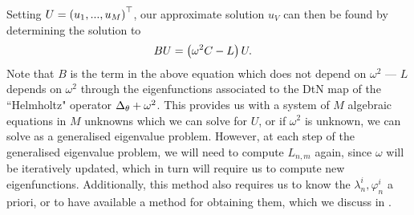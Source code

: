 Setting $U = \left( u_1, ..., u_M \right)^\top$, our approximate solution $u_V$ can then be found by determining the solution to
\begin{align*}
	B U &= \left( \omega^2 C - L \right) U.
\end{align*}
Note that $B$ is the term in the above equation which does not depend on $\omega^2$ --- $L$ depends on $\omega^2$ through the eigenfunctions associated to the DtN map of the ``Helmholtz" operator $\Delta_{\theta}+\omega^2$.
This provides us with a system of $M$ algebraic equations in $M$ unknowns which we can solve for $U$, or if $\omega^2$ is unknown, we can solve as a generalised eigenvalue problem.
However, at each step of the generalised eigenvalue problem, we will need to compute $L_{n,m}$ again, since $\omega$ will be iteratively updated, which in turn will require us to compute new eigenfunctions.
Additionally, this method also requires us to know the $\lambda_n^i, \varphi_n^i$ a priori, or to have available a method for obtaining them, which we discuss in .

